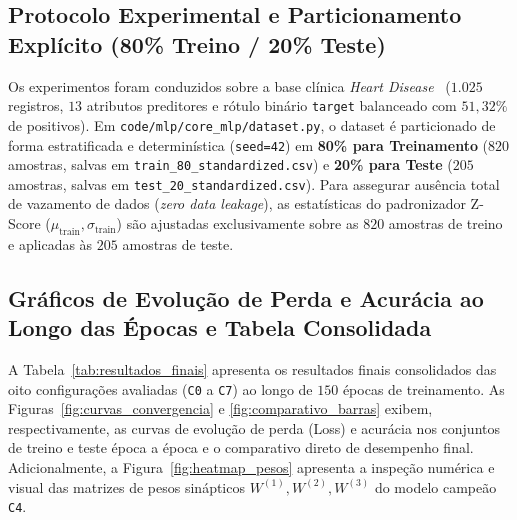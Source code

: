 \documentclass[runningheads]{llncs}
\begin{document}
\subsection{Protocolo Experimental e Particionamento Expl\'{i}cito (80\% Treino / 20\% Teste)}
Os experimentos foram conduzidos sobre a base cl\'{i}nica \textit{Heart Disease}~\cite{detrano1989international} ($1.025$ registros, $13$ atributos preditores e r\'{o}tulo bin\'{a}rio \texttt{target} balanceado com $51{,}32\%$ de positivos). Em \texttt{code/mlp/core\_mlp/dataset.py}, o dataset \'{e} particionado de forma estratificada e determin\'{i}stica (\texttt{seed=42}) em \textbf{80\% para Treinamento} ($820$ amostras, salvas em \texttt{train\_80\_standardized.csv}) e \textbf{20\% para Teste} ($205$ amostras, salvas em \texttt{test\_20\_standardized.csv}). Para assegurar aus\^{e}ncia total de vazamento de dados (\textit{zero data leakage}), as estat\'{i}sticas do padronizador Z-Score ($\mu_{\text{train}}, \sigma_{\text{train}}$) s\~{a}o ajustadas exclusivamente sobre as $820$ amostras de treino e aplicadas \`{a}s $205$ amostras de teste.

\subsection{Gr\'{a}ficos de Evolu\c{c}\~{a}o de Perda e Acur\'{a}cia ao Longo das \'{E}pocas e Tabela Consolidada}
A Tabela~\ref{tab:resultados_finais} apresenta os resultados finais consolidados das oito configura\c{c}\~{o}es avaliadas (\texttt{C0} a \texttt{C7}) ao longo de $150$ \'{e}pocas de treinamento. As Figuras~\ref{fig:curvas_convergencia} e \ref{fig:comparativo_barras} exibem, respectivamente, as curvas de evolu\c{c}\~{a}o de perda (Loss) e acur\'{a}cia nos conjuntos de treino e teste \'{e}poca a \'{e}poca e o comparativo direto de desempenho final. Adicionalmente, a Figura~\ref{fig:heatmap_pesos} apresenta a inspe\c{c}\~{a}o num\'{e}rica e visual das matrizes de pesos sin\'{a}pticos $W^{(1)}, W^{(2)}, W^{(3)}$ do modelo campe\~{a}o \texttt{C4}.
\end{document}

